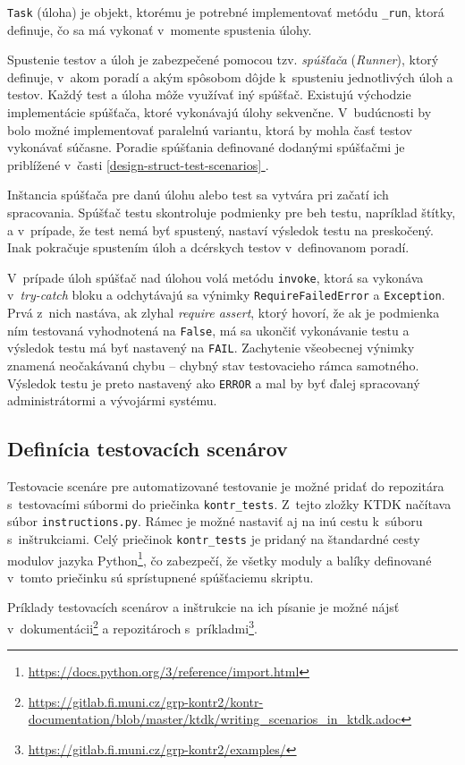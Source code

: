 \documentclass[
  digital, %
  oneside, %
  table,   %
  lof,     %
  lot,   %
]{fithesis3}
\newcommand*{\fullref}[1]{\hyperref[{#1}]{\ref*{#1} \nameref*{#1}}}
\begin{document}
\texttt{Task} (úloha) je objekt, ktorému je potrebné implementovať metódu \texttt{\_run}, ktorá definuje, čo sa má vykonať v~momente spustenia úlohy. 

Spustenie testov a úloh je zabezpečené pomocou tzv. \emph{spúšťača} (\emph{Runner}), ktorý definuje, v~akom poradí a akým spôsobom dôjde k~spusteniu jednotlivých úloh a testov. Každý test a úloha môže využívať iný spúšťač. Existujú východzie implementácie spúšťača, ktoré vykonávajú úlohy sekvenčne. V~budúcnosti by bolo možné implementovať paralelnú variantu, ktorá by mohla časť testov vykonávať súčasne. Poradie spúšťania definované dodanými spúšťačmi je priblížené v~časti \fullref{design-struct-test-scenarios}.

Inštancia spúšťača pre danú úlohu alebo test sa vytvára pri začatí ich spracovania. Spúšťač testu skontroluje podmienky pre beh testu, napríklad štítky, a v~prípade, že test nemá byť spustený, nastaví výsledok testu na preskočený. Inak pokračuje spustením úloh a dcérskych testov v~definovanom poradí.

V~prípade úloh spúšťač nad úlohou volá metódu \texttt{invoke}, ktorá sa vykonáva v~\emph{try-catch} bloku a odchytávajú sa výnimky \texttt{RequireFailedError} a \texttt{Exception}. Prvá z~nich nastáva, ak zlyhal \emph{require assert}, ktorý hovorí, že ak je podmienka ním testovaná vyhodnotená na \texttt{False}, má sa ukončiť vykonávanie testu a výsledok testu má byť nastavený na \texttt{FAIL}. Zachytenie všeobecnej výnimky znamená neočakávanú chybu -- chybný stav testovacieho rámca samotného. Výsledok testu je preto nastavený ako \texttt{ERROR} a mal by byť ďalej spracovaný administrátormi a vývojármi systému.

\subsection{Definícia testovacích scenárov}

Testovacie scenáre pre automatizované testovanie je možné pridať do repozitára s~testovacími súbormi do priečinka \texttt{kontr\_tests}. Z~tejto zložky KTDK načítava súbor \texttt{instructions.py}. Rámec je možné nastaviť aj na inú cestu k~súboru s~inštrukciami. Celý priečinok \texttt{kontr\_tests} je pridaný na štandardné cesty modulov jazyka Python\footnote{\url{https://docs.python.org/3/reference/import.html}}, čo zabezpečí, že všetky moduly a balíky definované v~tomto priečinku sú sprístupnené spúšťaciemu skriptu.

Príklady testovacích scenárov a inštrukcie na ich písanie je možné nájsť v~dokumentácii\footnote{\url{https://gitlab.fi.muni.cz/grp-kontr2/kontr-documentation/blob/master/ktdk/writing_scenarios_in_ktdk.adoc}} a repozitároch s~príkladmi\footnote{\url{https://gitlab.fi.muni.cz/grp-kontr2/examples/}}. 
\end{document}
